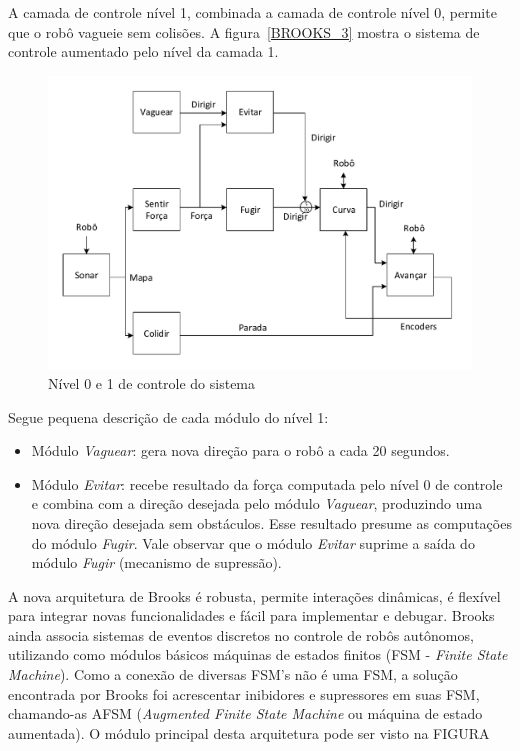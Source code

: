  A camada de controle nível 1, combinada a camada de controle nível 0, permite
 que o robô vagueie sem colisões. A figura~\ref{BROOKS_3} mostra o sistema de
 controle aumentado pelo nível da camada 1.

\begin{figure}[H]
\centering
\includegraphics[width=1\columnwidth]{figs/BROOKS_4.pdf}
\caption{Nível 0 e 1 de controle do sistema}
\label{BROOKS_4}
\end{figure}

Segue pequena descrição de cada módulo do nível 1:
\begin{itemize}
  \item Módulo \emph{Vaguear}: gera nova direção para o robô a cada 20 segundos.
  \item Módulo \emph{Evitar}: recebe resultado da força computada pelo nível 0
  de controle e combina com a direção desejada pelo módulo \emph{Vaguear},
  produzindo uma nova direção desejada sem obstáculos. Esse resultado presume as
  computações do módulo \emph{Fugir}. Vale observar que o módulo \emph{Evitar}
  suprime a saída do módulo \emph{Fugir} (mecanismo de supressão). 
\end{itemize}

A nova arquitetura de Brooks é robusta, permite interações dinâmicas, é flexível
para integrar novas funcionalidades e fácil para implementar e debugar. Brooks
ainda associa sistemas de eventos discretos no controle de robôs autônomos,
utilizando como módulos básicos máquinas de estados finitos (FSM - \emph{Finite
State Machine}). Como a conexão de diversas FSM's não é uma FSM, a solução
encontrada por Brooks foi acrescentar inibidores e supressores em suas
FSM, chamando-as AFSM (\emph{Augmented Finite State Machine} ou máquina de
estado aumentada). O módulo principal desta arquitetura pode ser visto na FIGURA



